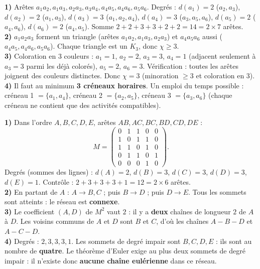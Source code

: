 \textbf{1)} Arêtes $a_1a_2,a_1a_3,a_2a_3,a_3a_4,a_4a_5,a_4a_6,a_5a_6$. Degrés :
$d(a_1)=2$ ($a_2,a_3$), $d(a_2)=2$ ($a_1,a_3$), $d(a_3)=3$ ($a_1,a_2,a_4$),
$d(a_4)=3$ ($a_3,a_5,a_6$), $d(a_5)=2$ ($a_4,a_6$), $d(a_6)=2$ ($a_4,a_5$). Somme
$2+2+3+3+2+2=14=2\times7$ arêtes.\\
\textbf{2)} $a_1a_2a_3$ forment un triangle (arêtes $a_1a_2,a_1a_3,a_2a_3$) et $a_4a_5a_6$
aussi ($a_4a_5,a_4a_6,a_5a_6$). Chaque triangle est un $K_3$, donc $\chi\ge 3$.\\
\textbf{3)} Coloration en $3$ couleurs : $a_1=1$, $a_2=2$, $a_3=3$, $a_4=1$ (adjacent
seulement à $a_3=3$ parmi les déjà colorés), $a_5=2$, $a_6=3$. Vérification : toutes les
arêtes joignent des couleurs distinctes. Donc $\chi=3$ (minoration $\ge3$ et coloration en
$3$).\\
\textbf{4)} Il faut au minimum \textbf{3 créneaux horaires}. Un emploi du temps possible :
créneau 1 $=\{a_1,a_4\}$, créneau 2 $=\{a_2,a_5\}$, créneau 3 $=\{a_3,a_6\}$ (chaque créneau
ne contient que des activités compatibles).

\textbf{1)} Dans l'ordre $A,B,C,D,E$, arêtes $AB,AC,BC,BD,CD,DE$ :
\[
M=\begin{pmatrix}0&1&1&0&0\\1&0&1&1&0\\1&1&0&1&0\\0&1&1&0&1\\0&0&0&1&0\end{pmatrix}.
\]
Degrés (sommes des lignes) : $d(A)=2$, $d(B)=3$, $d(C)=3$, $d(D)=3$, $d(E)=1$. Contrôle :
$2+3+3+3+1=12=2\times6$ arêtes.\\
\textbf{2)} En partant de $A$ : $A\to B,C$ ; puis $B\to D$ ; puis $D\to E$. Tous les sommets
sont atteints : le réseau est \textbf{connexe}.\\
\textbf{3)} Le coefficient $(A,D)$ de $M^2$ vaut $2$ : il y a \textbf{deux} chaînes de
longueur $2$ de $A$ à $D$. Les voisins communs de $A$ et $D$ sont $B$ et $C$, d'où les
chaînes $A\!-\!B\!-\!D$ et $A\!-\!C\!-\!D$.\\
\textbf{4)} Degrés : $2,3,3,3,1$. Les sommets de degré impair sont $B,C,D,E$ : ils sont au
nombre de \textbf{quatre}. Le théorème d'Euler exige au plus deux sommets de degré impair :
il n'existe donc \textbf{aucune chaîne eulérienne} dans ce réseau.
